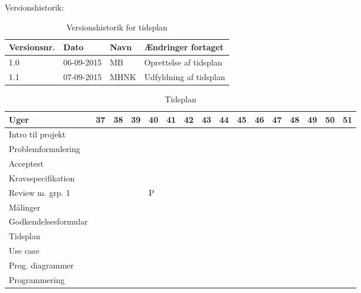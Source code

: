 \documentclass[landscape, 12pt, letterpaper]{article}
\begin{document}
Versionshistorik:
\begin{table}[]
\centering
\caption{Versionshistorik for tidsplan}
\label{my-label}
\begin{tabular}{|l|l|l|l|}
\hline
Versionsnr. & Dato       & Navn & Ændringer fortaget     \\ \hline
1.0         & 06-09-2015 & MB   & Oprettelse af tidsplan \\ \hline
1.1         & 07-09-2015 & MHNK & Udfyldning af tidsplan \\ \hline
\end{tabular}
\end{table}

\begin{table}[]
\centering
\caption{Tidsplan}
\label{my-label}
\begin{tabular}{|l|l|l|l|l|l|l|l|l|l|l|l|l|l|l|l|}
\hline
Uger                    & 37 & 38 & 39 & 40 & 41 & 42 & 43 & 44 & 45 & 46 & 47 & 48 & 49 & 50 & 51 \\ \hline
Intro til projekt       &    &    &    &    &    &    &    &    &    &    &    &    &    &    &    \\ \hline
Problemformulering      &    &    &    &    &    &    &    &    &    &    &    &    &    &    &    \\ \hline
Acceptest               &    &    &    &    &    &    &    &    &    &    &    &    &    &    &    \\ \hline
Kravsspecifikation      &    &    &    &    &    &    &    &    &    &    &    &    &    &    &    \\ \hline
Review m. grp. 1        &    &    &    &  P &    &    &    &    &    &    &    &    &    &    &    \\ \hline
Målinger                &    &    &    &    &    &    &    &    &    &    &    &    &    &    &    \\ \hline
Godkendelsesformular    &    &    &    &    &    &    &    &    &    &    &    &    &    &    &    \\ \hline
Tidsplan                &    &    &    &    &    &    &    &    &    &    &    &    &    &    &    \\ \hline
Use case                &    &    &    &    &    &    &    &    &    &    &    &    &    &    &    \\ \hline
Prog. diagrammer        &    &    &    &    &    &    &    &    &    &    &    &    &    &    &    \\ \hline
Programmering           &    &    &    &    &    &    &    &    &    &    &    &    &    &    &    \\ \hline

\end{tabular}
\end{table}
\end{document}
